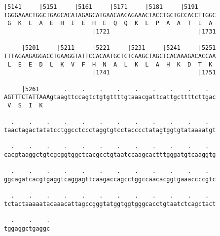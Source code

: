 \documentclass{article}
\begin{document}
\begin{Verbatim}[fontfamily=courier]
     |5141     |5151     |5161     |5171     |5181     |5191
TGGGAAACTGGCTGAGCACATAGAGCATGAACAACAGAAACTACCTGCTGCCACCTTGGC
 G  K  L  A  E  H  I  E  H  E  Q  Q  K  L  P  A  A  T  L  A 
                         |1721                         |1731

     |5201     |5211     |5221     |5231     |5241     |5251
TTTAGAAGAGGACCTGAAGGTATTCCACAATGCTCTCAAGCTAGCTCACAAAGACACCAA
 L  E  E  D  L  K  V  F  H  N  A  L  K  L  A  H  K  D  T  K 
                         |1741                         |1751

     |5261       .    .    .    .    .    .    .    .    .  
AGTTTCTATTAAAgtaagttccagtctgtgttttgtaaacgattcattgcttttcttgac
 V  S  I  K                                                 

  .    .    .    .    .    .    .    .    .    .    .    .  
taactagactatatcctggcctccctaggtgtcctacccctatagtggtgtataaaatgt

  .    .    .    .    .    .    .    .    .    .    .    .  
cacgtaaggctgtcgcggtggctcacgcctgtaatccaagcactttgggatgtcaaggtg

  .    .    .    .    .    .    .    .    .    .    .    .  
ggcagatcacgtgaggtcaggagttcaagaccagcctggccaacacggtgaaaccccgtc

  .    .    .    .    .    .    .    .    .    .    .    .  
tctactaaaaatacaaacattagccgggtatggtggtgggcacctgtaatctcagctact

  .    .    .
tggaggctgaggc
\end{Verbatim}
\newpage
\end{document}
